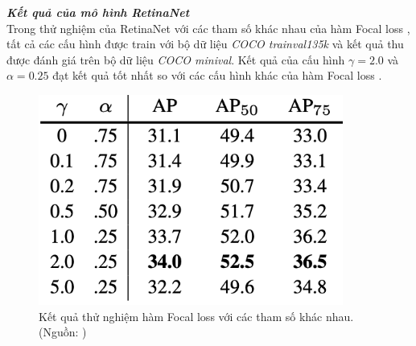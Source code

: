 {    \noindent
    \textbf{\textit{Kết quả của mô hình RetinaNet}} \\
    Trong thử nghiệm của RetinaNet  với các tham số khác nhau của hàm Focal loss , tất cả các cấu hình được train với bộ dữ liệu \textit{COCO trainval135k} và kết quả thu được đánh giá trên bộ dữ liệu \textit{COCO minival}.
    Kết quả của cấu hình $\gamma = 2.0$ và $\alpha = 0.25$ đạt kết quả tốt nhất so với các cấu hình khác của hàm Focal loss .

    \begin{figure}[H]
        \centering
        \includegraphics[width=10cm] {images/retinanet_results_2}
        \caption{Kết quả thử nghiệm hàm Focal loss  với các tham số khác nhau. (Nguồn: \cite{lin2017focal})}
        \label{fig:retinanet_results_2}
    \end{figure}

}
